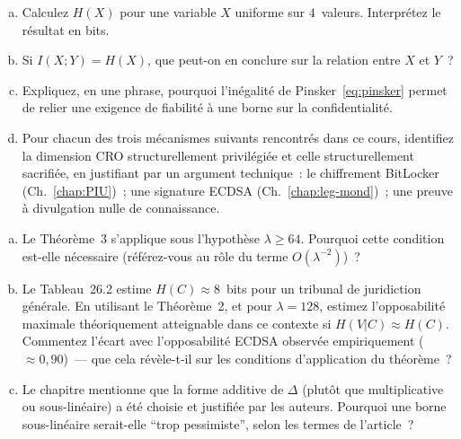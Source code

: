 \bigskip

\begin{boxexo}[title={\ding{45}\quad Exercice~26.1 --- Maîtrise des outils de théorie de l'information \niveaubase}]
\begin{enumerate}[(a)]
    \item Calculez $H(X)$ pour une variable $X$ uniforme sur
          $4$~valeurs. Interprétez le résultat en bits.
    \item Si $I(X;Y) = H(X)$, que peut-on en conclure sur la
          relation entre $X$ et $Y$~?
    \item Expliquez, en une phrase, pourquoi l'inégalité de
          Pinsker~\eqref{eq:pinsker} permet de relier une exigence
          de fiabilité à une borne sur la confidentialité.
    \item Pour chacun des trois mécanismes suivants rencontrés
          dans ce cours, identifiez la dimension CRO structurellement
          privilégiée et celle structurellement sacrifiée, en
          justifiant par un argument technique~: le chiffrement
          BitLocker (Ch.~\ref{chap:PIU})~; une signature ECDSA
          (Ch.~\ref{chap:leg-mond})~; une preuve à divulgation
          nulle de connaissance.
\end{enumerate}
\end{boxexo}

\begin{boxexo}[title={\ding{45}\quad Exercice~26.2 --- Lecture critique du Théorème~3 \niveaumoyen}]
\begin{enumerate}[(a)]
    \item Le Théorème~3 s'applique sous l'hypothèse
          $\lambda \geq 64$. Pourquoi cette condition est-elle
          nécessaire (référez-vous au rôle du terme
          $O(\lambda^{-2})$)~?
    \item Le Tableau~26.2 estime $H(C) \approx 8$~bits pour un
          tribunal de juridiction générale. En utilisant le
          Théorème~2, et pour $\lambda = 128$, estimez l'opposabilité
          maximale théoriquement atteignable dans ce contexte si
          $H(V|C) \approx H(C)$. Commentez l'écart avec
          l'opposabilité ECDSA observée empiriquement
          ($\approx 0{,}90$)~--- que cela révèle-t-il sur les
          conditions d'application du théorème~?
    \item Le chapitre mentionne que la forme additive de $\Delta$
          (plutôt que multiplicative ou sous-linéaire) a été
          choisie et justifiée par les auteurs. Pourquoi une
          borne sous-linéaire serait-elle ``trop pessimiste'',
          selon les termes de l'article~?
\end{enumerate}
\end{boxexo}

